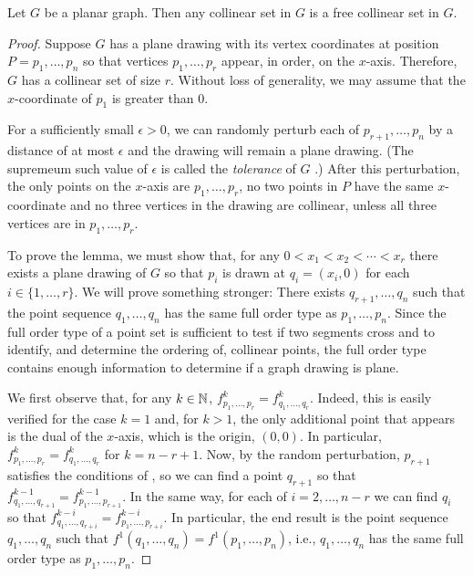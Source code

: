 \documentclass{patmorin}
\begin{document}
\begin{lem}
   Let $G$ be a planar graph.  Then any collinear set in $G$ is a free
   collinear set in $G$.
\end{lem}

\begin{proof}
   Suppose $G$ has a plane drawing with its vertex coordinates at position
   $P=p_1,\ldots,p_n$ so that vertices $p_1,\ldots,p_r$ appear, in order,
   on the $x$-axis.  Therefore, $G$ has a collinear set of size $r$.
   Without loss of generality, we may assume that the $x$-coordinate of
   $p_1$ is greater than 0.

   For a sufficiently small $\epsilon>0$, we can randomly perturb each
   of $p_{r+1},\ldots,p_n$ by a distance of at most $\epsilon$ and the
   drawing will remain a plane drawing. (The supremeum such value of
   $\epsilon$ is called the \emph{tolerance} of $G$ \cite{X}.)  After this
   perturbation, the only points on the $x$-axis are $p_1,\ldots,p_r$,
   no two points in $P$ have the same $x$-coordinate and no three
   vertices in the drawing are collinear, unless all three vertices are
   in $p_1,\ldots,p_r$.

   To prove the lemma, we must show that, for any $0<x_1<x_2<\cdots<x_r$
   there exists a plane drawing of $G$ so that $p_i$ is drawn at
   $q_i=(x_i,0)$ for each $i\in\{1,\ldots,r\}$.  We will prove
   something stronger: There exists $q_{r+1},\ldots,q_n$ such that
   the point sequence $q_1,\ldots,q_n$ has the same full order type
   as $p_1,\ldots,p_n$. Since the full order type of a point set
   is sufficient to test if two segments cross and to identify, and
   determine the ordering of, collinear points, the full order type
   contains enough information to determine if a graph drawing is plane.

   We first observe that, for any $k\in\mathbb{N}$,
   $f^{k}_{p_1,\ldots,p_r}=f^{k}_{q_1,\ldots,q_r}$.  Indeed,
   this is easily verified for the case $k=1$ and, for $k>1$,
   the only additional point that appears is the dual of
   the $x$-axis, which is the origin, $(0,0)$.  In particular,
   $f^{k}_{p_1,\ldots,p_r}=f^{k}_{q_1,\ldots,q_r}$ for $k=n-r+1$.
   Now, by the random perturbation, $p_{r+1}$ satisfies the
   conditions of , so we can find a point $q_{r+1}$ so
   that $f^{k-1}_{q_1,\ldots,q_{r+1}}=f^{k-1}_{p_1,\ldots,p_{r+1}}$.
   In the same way, for each of $i=2,\ldots,n-r$ we can find $q_i$ so
   that $f^{k-i}_{q_1,\ldots,q_{r+i}} = f^{k-i}_{p_1,\ldots,p_{r+i}}$.
   In particular, the end result is the point sequence $q_1,\ldots,q_n$
   such that $f^{1}(q_1,\ldots,q_n)=f^{1}(p_1,\ldots,p_n)$, i.e.,
   $q_1,\ldots,q_n$ has the same full order type as $p_1,\ldots,p_n$.
\end{proof}
\end{document}
